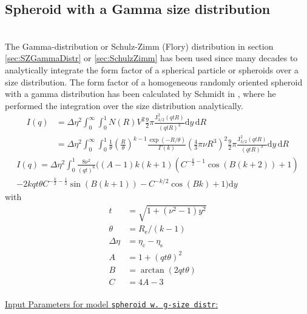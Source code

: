 \subsection{Spheroid with a Gamma size distribution}
\label{sec:SpheroidSZdistr}~\\
The Gamma-distribution or Schulz-Zimm (Flory) distribution in section \ref{sec:SZGammaDistr} or \ref{sec:SchulzZimm} has been used since many decades \cite{Schmidt1958,Aragon1976,Schmidt1984,Bartlett1992,Heinemann2000,Wagner2004,Forster2005} to analytically integrate the form factor of a spherical particle or spheroids over a size distribution. The form factor of a homogeneous randomly oriented spheroid with a gamma distribution has been calculated by Schmidt in \cite{Schmidt1958}, where he performed the integration over the size distribution analytically.
\begin{align}\label{eq:spherid_start}
  I(q) &= \Delta\eta^2 \int_0^\infty\int_0^1 N(R) V^2 \frac92\pi\frac{\mathrm{J}_{3/2}^2(qtR)}{(qtR)^3} \mathrm{d}y \, \mathrm{d}R\\
       &= \Delta\eta^2 \int_0^\infty\int_0^1 \frac{1}{\theta}
\left(\frac{R}{\theta}\right)^{k-1}
\frac{\exp(-R/\theta)}{\Gamma(k)} \left(\frac{4}{3}\pi\nu R^3\right)^2 \frac92\pi\frac{\mathrm{J}_{3/2}^2(qtR)}{(qtR)^3} \mathrm{d}y \, \mathrm{d}R
\end{align}
\begin{multline}
\label{eq:spheroid_GD}
  I(q) = \Delta\eta^2 \int_0^1 \frac{8\nu^2}{(qt)^6} \Bigg((A-1) k (k+1)  \left(C^{-\frac{k}{2}-1} \cos (B (k+2))+1\right) \\
                           -2 k qt\theta C^{-\frac{k}{2}-\frac{1}{2}} \sin (B(k+1))-C^{-k/2} \cos (B k)+1\Bigg) \mathrm{d}y
\end{multline}
with
\begin{align}\label{eq:spheroid_tABC}
  t &= \sqrt{1+\left(\nu^2-1\right)y^2}\\
  \theta &= R_\mathrm{e}/(k-1)\\
  \Delta\eta&=\eta_\mathrm{c}-\eta_\mathrm{s}\\
  A &= 1+(qt\theta)^2\\
  B &= \arctan\left(2qt\theta\right)\\
  C &=4A-3
\end{align}
~\\
\underline{Input Parameters for model \texttt{spheroid w. g-size distr}:}

